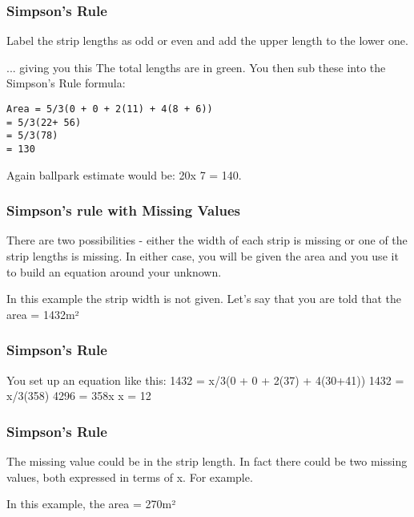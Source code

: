 \documentclass{beamer}
\begin{document}
\begin{frame}[fragile]
	\frametitle{Simpson's Rule}
	\Large
Label the strip lengths as odd or even and add the upper length to the lower one.

... giving you this
The total lengths are in green. You then sub these into the Simpson's Rule formula:

\end{frame}
\begin{frame}[fragile]

\begin{verbatim}
Area = 5/3(0 + 0 + 2(11) + 4(8 + 6))
= 5/3(22+ 56)
= 5/3(78)
= 130
\end{verbatim}
\end{frame}
\begin{frame}[fragile]
Again ballpark estimate would be: 20x 7 = 140.


\end{frame}
\begin{frame}[fragile]
\frametitle{Simpson's rule with Missing Values}
There are two possibilities - either the width of each strip is missing or one of the strip lengths is missing. In either case, you will be given the area and you use it to build an equation around your unknown.

In this example the strip width is not given.
Let's say that you are told that the
area = 1432m²
\end{frame}
\begin{frame}[fragile]
	\frametitle{Simpson's Rule}
	\Large

You set up an equation like this:
1432 = x/3(0 + 0 + 2(37) + 4(30+41))
1432 = x/3(358)
4296 = 358x
x = 12

\end{frame}
\begin{frame}[fragile]
\frametitle{Simpson's Rule}
\Large


The missing value could be in the strip length.
In fact there could be two missing values, both expressed in terms of x. For example.

In this example, the area = 270m²
\end{frame}
\end{document}
